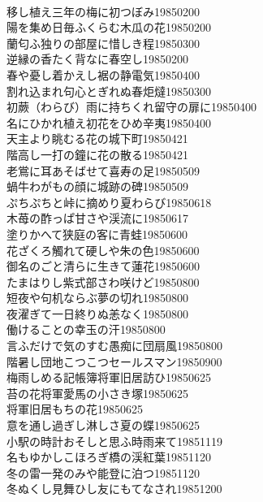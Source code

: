 \begin{multicols}{2}
\\移し植え三年の梅に初つぼみ\hfill{19850200}
\\陽を集め日毎ふくらむ木瓜の花\hfill{19850200}
\\蘭匂ふ独りの部屋に惜しき程\hfill{19850300}
\\逆縁の香たく背なに春空し\hfill{19850200}
\\春や憂し着かえし裾の静電気\hfill{19850400}
\\割れ込まれ句心とぎれぬ春炬燵\hfill{19850300}
\\初蕨（わらび）雨に持ちくれ留守の扉に\hfill{19850400}
\\名にひかれ植え初花をひめ辛夷\hfill{19850400}
\\天主より眺むる花の城下町\hfill{19850421}
\\階高し一打の鐘に花の散る\hfill{19850421}
\\老鴬に耳あそばせて喜寿の足\hfill{19850509}
\\蝸牛わがもの顔に城跡の碑\hfill{19850509}
\\ぷちぷちと峠に摘めり夏わらび\hfill{19850618}
\\木苺の酢っぱ甘さや渓流に\hfill{19850617}
\\塗りかへて狭庭の客に青蛙\hfill{19850600}
\\花ざくろ觸れて硬しや朱の色\hfill{19850600}
\\御名のごと清らに生きて蓮花\hfill{19850600}
\\たまはりし紫式部さわ咲けど\hfill{19850800}
\\短夜や句机ならぶ夢の切れ\hfill{19850800}
\\夜濯ぎて一日終りぬ恙なく\hfill{19850800}
\\働けることの幸玉の汗\hfill{19850800}
\\言ふだけで気のすむ愚痴に団扇風\hfill{19850800}
\\階暑し団地こつこつセールスマン\hfill{19850900}
\\梅雨しめる記帳簿将軍旧居訪ひ\hfill{19850625}
\\苔の花将軍愛馬の小さき塚\hfill{19850625}
\\将軍旧居もちの花\hfill{19850625}
\\意を通し過ぎし淋しさ夏の蝶\hfill{19850625}
\\小駅の時計おそしと思ふ時雨来て\hfill{19851119}
\\名もゆかしこほろぎ橋の渓紅葉\hfill{19851120}
\\冬の雷一発のみや能登に泊つ\hfill{19851120}
\\冬ぬくし見舞ひし友にもてなされ\hfill{19851200}

\end{multicols}

